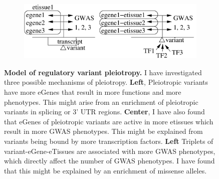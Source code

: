%
\begin{figure}[!tbp]
    \centering
%
    \begin{subfigure}[]{\textwidth}

        \includegraphics[width=\textwidth]{fig/graphical_summary.png}
    \end{subfigure}

    \caption{\textbf{Model of regulatory variant pleiotropy.} I have investigated three possible mechanisms of pleiotropy. \textbf{Left}, Pleiotropic variants have more eGenes that result in more functions and more phenotypes. This might arise from an enrichment of pleiotropic variants in splicing or 3' UTR regions. \textbf{Center}, I have also found that eGenes of pleiotropic variants are active in more etissues which result in more GWAS phenotypes. This might be explained from variants being bound by more transcription factors. \textbf{Left} Triplets of variant-eGene-eTissues are associated with more GWAS phenotypes, which directly affect the number of GWAS phenotypes. I have found that this might be explained by an enrichment of missense alleles.} \label{fig:beta}
%
\end{figure}

